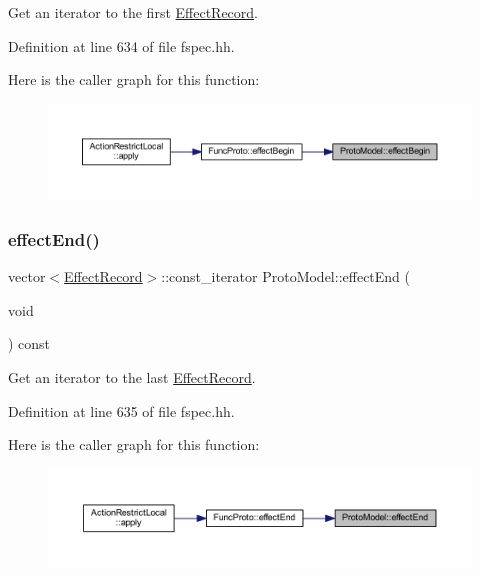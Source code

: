 Get an iterator to the first \mbox{\hyperlink{class_effect_record}{Effect\+Record}}. 



Definition at line 634 of file fspec.\+hh.

Here is the caller graph for this function\+:
\nopagebreak
\begin{figure}[H]
\begin{center}
\leavevmode
\includegraphics[width=350pt]{class_proto_model_a5c9fa95940e32b03d475257ca177cfaa_icgraph}
\end{center}
\end{figure}
\mbox{\label{class_proto_model_ac5eccb4ede5b877d6256cbbc2b9f4666}} 
\subsubsection{\texorpdfstring{effectEnd()}{effectEnd()}}
{\footnotesize\ttfamily vector$<$\mbox{\hyperlink{class_effect_record}{Effect\+Record}}$>$\+::const\+\_\+iterator Proto\+Model\+::effect\+End (\begin{DoxyParamCaption}\item[{void}]{ }\end{DoxyParamCaption}) const\hspace{0.3cm}{\ttfamily [inline]}}



Get an iterator to the last \mbox{\hyperlink{class_effect_record}{Effect\+Record}}. 



Definition at line 635 of file fspec.\+hh.

Here is the caller graph for this function\+:
\nopagebreak
\begin{figure}[H]
\begin{center}
\leavevmode
\includegraphics[width=350pt]{class_proto_model_ac5eccb4ede5b877d6256cbbc2b9f4666_icgraph}
\end{center}
\end{figure}
\mbox{\label{class_proto_model_a256b9f054603fd6d166fdf86689467bf}} 
